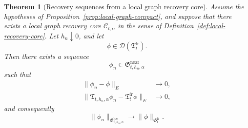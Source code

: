 \documentclass[11pt,a4paper]{amsart}
\theoremstyle{plain}
\newtheorem{theorem}{Theorem}[section]
\theoremstyle{definition}
\theoremstyle{remark}
\begin{document}
\begin{theorem}[Recovery sequences from a local graph recovery core]
\label{thm:local-recovery}
Assume the hypotheses of Proposition~\ref{prop:local-graph-compact}, and suppose that there
exists a local graph recovery core \(\mathcal C_{t,\alpha}\) in the sense of
Definition~\ref{def:local-recovery-core}. Let \(h_n\downarrow0\), and let
\[
\phi\in \mathcal D(\mathfrak T_t^{\mathrm{fr}}).
\]
Then there exists a sequence
\[
\phi_n\in \mathfrak G_{t,h_n,\alpha}^{\mathrm{near}}
\]
such that
\begin{align}
\|\phi_n-\phi\|_E &\longrightarrow 0, \label{eq:recovery-input}\\
\|\mathfrak T_{t,h_n,\alpha}\phi_n-\mathfrak T_t^{\mathrm{fr}}\phi\|_E
&\longrightarrow 0, \label{eq:recovery-output}
\end{align}
and consequently
\begin{equation}\label{eq:recovery-norm}
\|\phi_n\|_{\mathfrak G_{t,h_n,\alpha}^{\mathrm{loc}}}
\longrightarrow
\|\phi\|_{\mathfrak G_t^{\mathrm{fr}}}.
\end{equation}
\end{theorem}
\end{document}
